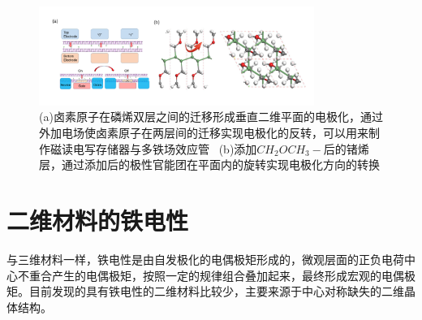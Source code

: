 \begin{figure}[h]
    \centering
\includegraphics[width=0.8\textwidth]{./pic/015.png}
\caption{(a)卤素原子在磷烯双层之间的迁移形成垂直二维平面的电极化，通过外加电场使卤素原子在两层间的迁移实现电极化的反转，可以用来制作磁读电写存储器与多铁场效应管 \ (b)添加$CH_{2}OCH_{3}-$后的锗烯层，通过添加后的极性官能团在平面内的旋转实现电极化方向的转换}

\label{dog015}
\end{figure}

\section{二维材料的铁电性}

与三维材料一样，铁电性是由自发极化的电偶极矩形成的，微观层面的正负电荷中心不重合产生的电偶极矩，按照一定的规律组合叠加起来，最终形成宏观的电偶极矩。目前发现的具有铁电性的二维材料比较少，主要来源于中心对称缺失的二维晶体结构。

